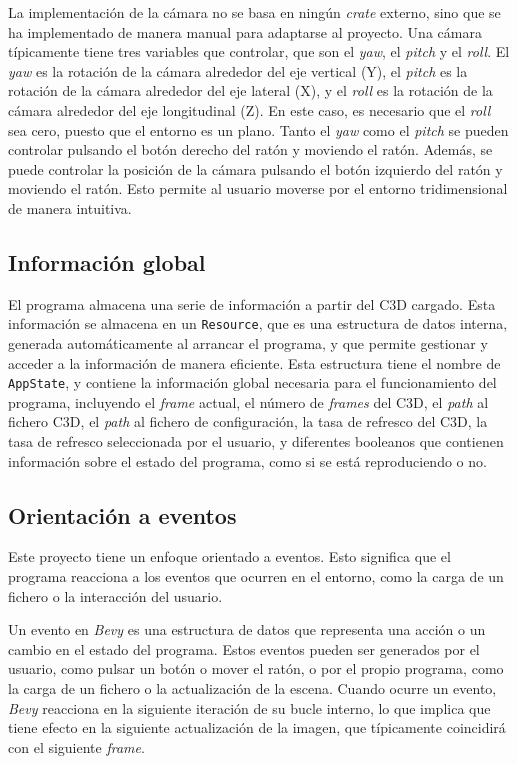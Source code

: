 La implementación de la cámara no se basa en ningún \textit{crate} externo, sino que se ha implementado de manera manual para adaptarse al proyecto. Una cámara típicamente tiene tres variables que controlar, que son el \textit{yaw}, el \textit{pitch} y el \textit{roll}. El \textit{yaw} es la rotación de la cámara alrededor del eje vertical (Y), el \textit{pitch} es la rotación de la cámara alrededor del eje lateral (X), y el \textit{roll} es la rotación de la cámara alrededor del eje longitudinal (Z). En este caso, es necesario que el \textit{roll} sea cero, puesto que el entorno es un plano. Tanto el \textit{yaw} como el \textit{pitch} se pueden controlar pulsando el botón derecho del ratón y moviendo el ratón. Además, se puede controlar la posición de la cámara pulsando el botón izquierdo del ratón y moviendo el ratón. Esto permite al usuario moverse por el entorno tridimensional de manera intuitiva.


\subsection{Información global} \label{sec:bevy-global}

El programa almacena una serie de información a partir del \ac{C3D} cargado. Esta información se almacena en un \texttt{Resource}, que es una estructura de datos interna, generada automáticamente al arrancar el programa, y que permite gestionar y acceder a la información de manera eficiente. Esta estructura tiene el nombre de \texttt{AppState}, y contiene la información global necesaria para el funcionamiento del programa, incluyendo el \textit{frame} actual, el número de \textit{frames} del \ac{C3D}, el \textit{path} al fichero \ac{C3D}, el \textit{path} al fichero de configuración, la tasa de refresco del \ac{C3D}, la tasa de refresco seleccionada por el usuario, y diferentes booleanos que contienen información sobre el estado del programa, como si se está reproduciendo o no.


\subsection{Orientación a eventos} \label{sec:bevy-eventos}

Este proyecto tiene un enfoque orientado a eventos. Esto significa que el programa reacciona a los eventos que ocurren en el entorno, como la carga de un fichero o la interacción del usuario. 

Un evento en \textit{Bevy} es una estructura de datos que representa una acción o un cambio en el estado del programa. Estos eventos pueden ser generados por el usuario, como pulsar un botón o mover el ratón, o por el propio programa, como la carga de un fichero o la actualización de la escena. Cuando ocurre un evento, \textit{Bevy} reacciona en la siguiente iteración de su bucle interno, lo que implica que tiene efecto en la siguiente actualización de la imagen, que típicamente coincidirá con el siguiente \textit{frame}.

